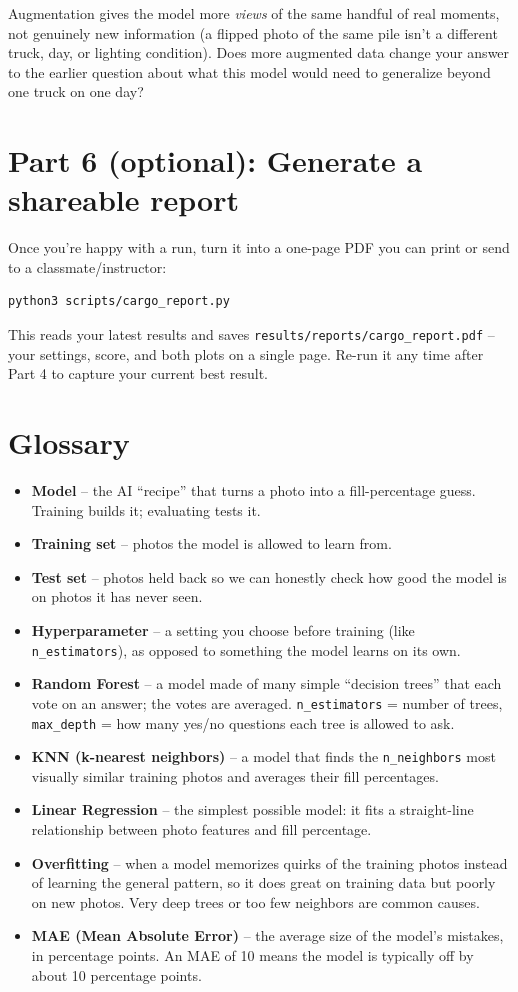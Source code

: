 \documentclass[11pt]{article}
\begin{document}
\begin{notebox}
Augmentation gives the model more \emph{views} of the same handful of real
moments, not genuinely new information (a flipped photo of the same pile
isn't a different truck, day, or lighting condition). Does more augmented
data change your answer to the earlier question about what this model would
need to generalize beyond one truck on one day?
\end{notebox}

\section*{Part 6 (optional): Generate a shareable report}
Once you're happy with a run, turn it into a one-page PDF you can print or
send to a classmate/instructor:
\begin{lstlisting}
python3 scripts/cargo_report.py
\end{lstlisting}
This reads your latest results and saves
\texttt{results/reports/cargo\_report.pdf} -- your settings, score, and both
plots on a single page. Re-run it any time after Part 4 to capture your
current best result.

\section*{Glossary}
\begin{itemize}
  \item \textbf{Model} -- the AI ``recipe'' that turns a photo into a fill-percentage guess. Training builds it; evaluating tests it.
  \item \textbf{Training set} -- photos the model is allowed to learn from.
  \item \textbf{Test set} -- photos held back so we can honestly check how good the model is on photos it has never seen.
  \item \textbf{Hyperparameter} -- a setting you choose before training (like \texttt{n\_estimators}), as opposed to something the model learns on its own.
  \item \textbf{Random Forest} -- a model made of many simple ``decision trees'' that each vote on an answer; the votes are averaged. \texttt{n\_estimators} = number of trees, \texttt{max\_depth} = how many yes/no questions each tree is allowed to ask.
  \item \textbf{KNN (k-nearest neighbors)} -- a model that finds the \texttt{n\_neighbors} most visually similar training photos and averages their fill percentages.
  \item \textbf{Linear Regression} -- the simplest possible model: it fits a straight-line relationship between photo features and fill percentage.
  \item \textbf{Overfitting} -- when a model memorizes quirks of the training photos instead of learning the general pattern, so it does great on training data but poorly on new photos. Very deep trees or too few neighbors are common causes.
  \item \textbf{MAE (Mean Absolute Error)} -- the average size of the model's mistakes, in percentage points. An MAE of 10 means the model is typically off by about 10 percentage points.
\end{itemize}
\end{document}

